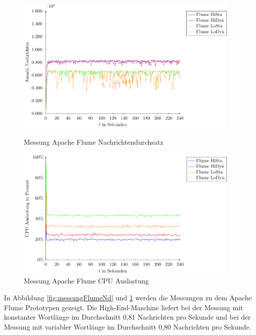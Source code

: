 \begin{figure}[!ht]
\includegraphics[width=0.97\textwidth]{plots/messungFlumeDurchsatz.pdf}
\caption{Messung Apache Flume Nachrichtendurchsatz
\label{fig:messungFlumeNd}}
\includegraphics[width=0.97\textwidth]{plots/messungFlumeCpu.pdf}
\caption{Messung Apache Flume CPU Auslastung
\label{fig:messungFlumeCpu}}
\end{figure}


In Abbildung \ref{fig:messungFlumeNd} und \ref{fig:messungFlumeCpu} werden die Messungen zu dem Apache Flume Prototypen gezeigt. Die High-End-Maschine liefert bei der Messung mit konstanter Wortlänge im Durchschnitt 0,81 Nachrichten pro Sekunde und bei der Messung mit variabler Wortlänge im Durchschnitt 0,80 Nachrichten pro Sekunde. 

